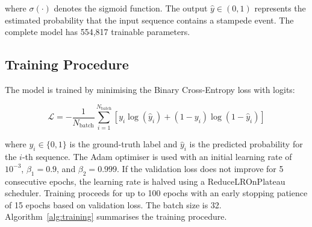 \noindent where $\sigma(\cdot)$ denotes the sigmoid function. The output $\hat{y} \in (0, 1)$ represents the estimated probability that the input sequence contains a stampede event. The complete model has 554,817 trainable parameters.

\subsection{Training Procedure}

The model is trained by minimising the Binary Cross-Entropy loss with logits:

\begin{equation}
  \mathcal{L} = -\frac{1}{N_{\text{batch}}} \sum_{i=1}^{N_{\text{batch}}} \left[ y_i \log(\hat{y}_i) + (1 - y_i) \log(1 - \hat{y}_i) \right]
  \label{eq:bce}
\end{equation}

\noindent where $y_i \in \{0, 1\}$ is the ground-truth label and $\hat{y}_i$ is the predicted probability for the $i$-th sequence. The Adam optimiser is used with an initial learning rate of $10^{-3}$, $\beta_1 = 0.9$, and $\beta_2 = 0.999$. If the validation loss does not improve for 5 consecutive epochs, the learning rate is halved using a ReduceLROnPlateau scheduler. Training proceeds for up to 100 epochs with an early stopping patience of 15 epochs based on validation loss. The batch size is 32. Algorithm~\ref{alg:training} summarises the training procedure.

